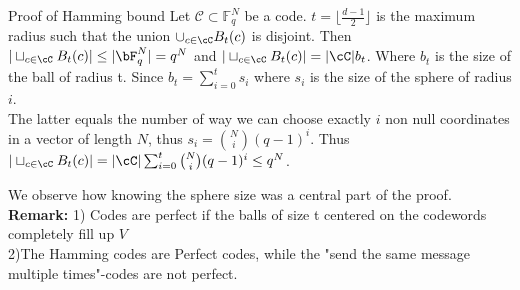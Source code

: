 \begin{frame}{Proof of Hamming bound}
Let \(\mathcal{C} \subset \mathbb{F}_q^N\) be a code. \pause \(t = \lfloor \frac{d-1}{2}\rfloor\) is the maximum radius such that the union \(\cup_{c \in \cC}B_t(c)\) is disjoint. 
\pause Then \(|\sqcup_{c \in \cC}B_t(c)|\leq |\bF_q^N|=q^N\) and \pause \(|\sqcup_{c \in \cC}B_t(c)| = |\cC|b_t\). Where \(b_t\) is the size of the ball of radius t. \pause Since \(b_t = \sum_{i=0}^ts_i\) where \(s_i\) is the size of the sphere of radius \(i\). \\ \pause The latter equals the number of way we can choose exactly \(i\) non null coordinates in a vector of length \(N\), thus \(s_i = \binom{N}{i}(q-1)^i\). \pause  Thus \(|\sqcup_{c \in \cC}B_t(c)| = |\cC|\sum_{i=0}^t \binom{N}{i}(q-1)^i \leq q^N \). 


\vspace{1cm} \pause
We observe how knowing the sphere size was a central part of the proof. \\ \pause
\vspace{1cm}
\textbf{Remark:} 1) Codes are perfect if the balls of size t centered on the codewords completely fill up \(V\) \\ \pause \hspace{1.5cm} 2)The Hamming codes are Perfect codes, while the "send the same message multiple times"-codes are not perfect.

\end{frame}



